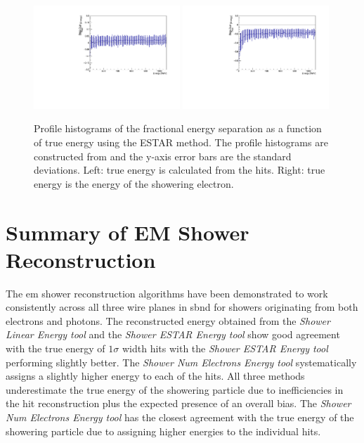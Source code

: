 \begin{figure}[h!]
    \centering
    \includegraphics[width = 0.49\textwidth]{figures-chap4/frac_res_vs_energy_cheating_electron_vertex_plane2_ESTAR_profile.pdf}
    \includegraphics[width = 0.49\textwidth]{figures-chap4/frac_res_vs_energy_cheating_electron_vertex_plane2_ESTAR_showeringE_profile.pdf}
    \caption[Profile histograms of the fractional energy separation as a function of true energy.]{Profile histograms of the fractional energy separation as a function of true energy using the ESTAR method. The profile histograms are constructed from  and the y-axis error bars are the standard deviations.  Left: true energy is calculated from the hits. Right: true energy is the energy of the showering electron.}
    \label{fig:reconstruction_as_a_function_of_energy_profile}
\end{figure}



\newpage

\section{Summary of EM Shower Reconstruction}

The \gls{em} shower reconstruction algorithms have been demonstrated to work consistently across all three wire planes in \gls{sbnd} for showers originating from both electrons and photons. The reconstructed energy obtained from the \textit{Shower Linear Energy tool} and the \textit{Shower ESTAR Energy tool} show good agreement with the true energy of $1 \sigma$ width hits with the \textit{Shower ESTAR Energy tool} performing slightly better. The \textit{Shower Num Electrons Energy tool} systematically assigns a slightly higher energy to each of the hits. All three methods underestimate the true energy of the showering particle due to inefficiencies in the hit reconstruction plus the expected presence of an overall bias. The \textit{Shower Num Electrons Energy tool} has the closest agreement with the true energy of the showering particle due to assigning higher energies to the individual hits.

